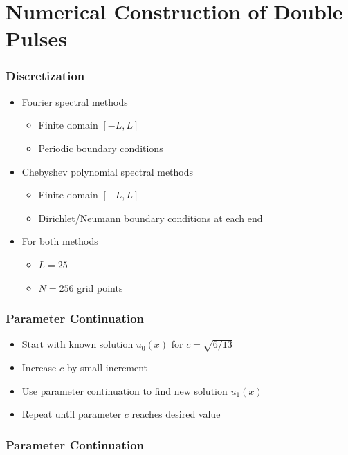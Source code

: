\documentclass[16pt]{beamer}
\begin{document}
\section{Numerical Construction of Double Pulses}

\begin{frame}
	\frametitle{Discretization}
	\fontsize{16}{7.2}\selectfont
	\begin{itemize} 
		\item Fourier spectral methods
		\begin{itemize} 
			\item Finite domain $[-L, L]$
			\item Periodic boundary conditions
		\end{itemize}
		\item Chebyshev polynomial spectral methods
		\begin{itemize} 
			\item Finite domain $[-L, L]$
			\item Dirichlet/Neumann boundary conditions at each end
		\end{itemize}
		\item For both methods
		\begin{itemize} 
			\item $L = 25$ 
			\item $N = 256$ grid points
		\end{itemize}
	\end{itemize}
\end{frame}

\begin{frame}
	\frametitle{Parameter Continuation}
	\fontsize{14}{7.2}\selectfont
	\begin{itemize}
		\item Start with known solution $u_0(x)$ for $c = \sqrt{6/13}$
		\item Increase $c$ by small increment
		\item Use parameter continuation to find new solution $u_1(x)$
		\item Repeat until parameter $c$ reaches desired value 
	\end{itemize}
\end{frame}

\begin{frame}
	\frametitle{Parameter Continuation}
	\begin{center}
	\end{center}
\end{frame}
\end{document}

